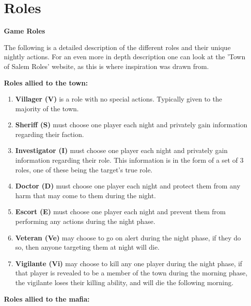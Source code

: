\section{Roles}\label{app:A}
\begin{center}
	\textbf{Game Roles}
\end{center}
The following is a detailed description of the
different roles and their unique nightly actions. For
an even more in depth description one can look at the
'Town of Salem Roles' website, as this is where
inspiration was drawn from\cite{TownOfSalemRoles}.

\textbf{Roles allied to the town:}
\begin{enumerate}
	\item\textbf{Villager (V)} is a  role with no special actions. Typically
	      given
	      to the majority of the town.
	\item\textbf{Sheriff (S)} must choose one player each night and privately
	      gain
	      information regarding their faction.
	\item\textbf{Investigator (I)} must choose one player each night and
	      privately gain information regarding their role. This information is 
	      in the form of a set of 3 roles, one of these being the target's true 
	      role. 
	\item\textbf{Doctor (D)} must choose one player each night and protect them
	      from any harm that may come to them during the night.
	\item\textbf{Escort (E)} must choose one player each night and prevent them
	      from performing any actions during the night phase.
	\item\textbf{Veteran (Ve)} may choose to go on alert during the night
	      phase, if
	      they do so, then anyone targeting them at night will die.
	\item\textbf{Vigilante (Vi)} may choose to kill any one player during the
	      night
	      phase, if that player is revealed to be a member of the town during the
	      morning phase, the vigilante loses their killing ability, and will die the
	      following morning.
\end{enumerate}
\textbf{Roles allied to the mafia:}
